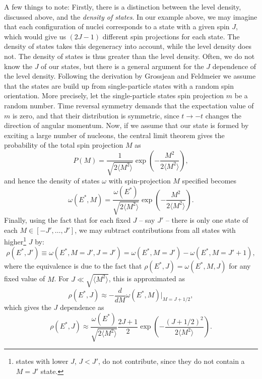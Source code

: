 A few things to note:
Firstly, there is a distinction between the level density, discussed above, and the \emph{density of states}. In our example above, we may imagine that each configuration of nuclei corresponds to a state with a given spin $J$, which would give us $(2J-1)$ different spin projections for each state. The density of states takes this degeneracy into account, while the level density does not. The density of states is thus greater than the level density.
Often, we do not know the $J$ of our states, but there is a general argument for the $J$ dependence of the level density.
Following the derivation by Grossjean and Feldmeier\cite{grossjean1985} we assume that the states are build up from single-particle states with a random spin orientation. More precisely, let the single-particle states spin projection $m$ be a random number. Time reversal symmetry demands that the expectation value of $m$ is zero, and that their distribution is symmetric, since $t\to -t$ changes the direction of angular momentum. Now, if we assume that our state is formed by exciting a large number of nucleons, the central limit theorem gives the probability of the total spin projection $M$ as
\begin{equation}
P(M) = \frac{1}{\sqrt{2\langle M^2\rangle}} \exp{\left(-\frac{M^2}{2\langle M^2\rangle}\right)},
\end{equation}
and hence the density of states $\omega$ with spin-projection $M$ specified becomes
\begin{equation}
\omega(E^*,M) =  \frac{\omega(E^*)}{\sqrt{2\langle M^2\rangle}} \exp{\left(-\frac{M^2}{2\langle M^2\rangle}\right)}.
\end{equation}
Finally, using the fact that for each fixed $J$ -- say $J'$ -- there is only one state of each $M \in [-J',\dots,J']$, we may subtract contributions from all states with higher\footnote{states with lower $J$, $J<J'$, do not contribute, since they do not contain a $M=J'$ state.} $J$ by:
\begin{equation}
\rho(E^*,J') \equiv \omega(E^*,M=J',J=J') = \omega(E^*,M=J')  -\omega(E^*,M=J'+1),
\end{equation}
where the equivalence is due to the fact that $\rho(E^*,J) = \omega(E^*,M, J)$ for any fixed value of $M$. For $J\ll \sqrt{\langle M^2 \rangle}$, this is approximated as
\begin{equation}
\rho(E^*,J) \approx - \frac{d}{dM} \omega(E^*,M)\big|_{M=J+1/2},\label{eq:odm}
\end{equation}
which gives the $J$ dependence as
\begin{equation}
\rho(E^*,J) \approx \frac{\omega(E^*)}{\sqrt{2\langle M^2\rangle}} \frac{2J+1}{2} \exp{\left(-\frac{(J+1/2)^2}{2\langle M^2\rangle}\right)}.\label{eq:rhoj}
\end{equation}

